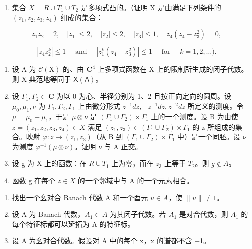 \begin{enumerate}
\def\labelenumi{\alph{enumi})}
\tightlist
\item
  集合 \(X = R \cup T_{1} \cup T_{2}\) 是多项式凸的。（证明 X 是由满足下列条件的 \((z_{1}, z_{2}, z_{3}, z_{4})\) 组成的集合：
\end{enumerate}

\[
z _ {1} z _ {2} = 2, \quad | z _ {1} | \leqslant 2, \quad | z _ {2} | \leqslant 2, \quad | z _ {3} | \leqslant 1, \quad z _ {4} (z _ {4} - z _ {3} ^ {2}) = 0,
\]

\[
| z _ {4} z _ {2} ^ {k} | \leqslant 1 \quad \text { and } \quad | z _ {1} ^ {k} (z _ {4} - z _ {3} ^ {2}) | \leqslant 1 \quad \text { for } \quad k = 1, 2, \ldots).
\]

\begin{enumerate}
\def\labelenumi{\alph{enumi})}
\setcounter{enumi}{1}
\item
  设 A 为 \(\mathcal{C}(\mathrm{X})\) 的、由 \(\mathbf{C}^4\) 上多项式函数在 X 上的限制所生成的闭子代数。则 X 典范地等同于 \(\mathsf{X}(\mathsf{A})\)。
\item
  设 \(\Gamma_1, \Gamma_2 \subset \mathbf{C}\) 为以 0 为心、半径分别为 1、2 且按正向定向的圆周。设 \(\mu_0, \mu_1, \nu\) 为 \(\Gamma_1, \Gamma_2, \Gamma_1\) 上由微分形式 \(z^{-1} dz, -z^{-1} dz, z^{-2} dz\) 所定义的测度。令 \(\mu = \mu_0 + \mu_1\)，于是 \(\mu \otimes \nu\) 是 \((\Gamma_1 \cup \Gamma_2) \times \Gamma_1\) 上的一个测度。设 B 为由使 \(z = (z_1, z_2, z_3, z_4) \in X\) 满足 \((z_1, z_3) \in (\Gamma_1 \cup \Gamma_2) \times \Gamma_1\) 的 z 所组成的集合。映射 \(\varphi: z \mapsto (z_1, z_3)\)（从 B 到 \((\Gamma_{1} \cup \Gamma_{2}) \times \Gamma_{1}\) 中）是一个同胚。设 \(\nu\) 为测度 \(\varphi^{-1}(\mu \otimes \nu)\)。证明 \(\nu\) 与 A 正交。
\item
  设 g 为 X 上的函数：在 \(R \cup T_{1}\) 上为零，而在 \(z_{3}\) 上等于 \(T_{2}\)。则 \(g \notin A\)。
\item
  函数 g 在每个 \(z \in X\) 的一个邻域中与 A 的一个元素相合。
\end{enumerate}


\begin{enumerate}
\def\labelenumi{\arabic{enumi})}
\item
  找出一个幺对合 Banach 代数 A 和一个酉元 \(u \in A\)，使 \(\|u\| \neq 1\)。
\item
  设 A 为 Banach 代数，\(A_{1} \subset A\) 为其闭子代数。若 \(A_{1}\) 是对合代数，则 \(A_{1}\) 的每个特征标都可以延拓为 A 的特征标。
\item
  设 A 为幺对合代数。假设对 A 中的每个 x，x 的谱都不含 −1。
\end{enumerate}

